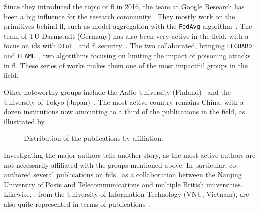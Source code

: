 Since they introduced the topic of \gls{fl} in 2016, the team at Google Research has been a big influence for the research community \cite{konecny_FederatedLearningStrategies_2016,konecny_FederatedOptimizationDistributed_2016,mcmahan_Communicationefficientlearningdeep_2017,bonawitz_PracticalSecureAggregation_2017,bonawitz_FederatedLearningScale_2019}.
They mostly work on the primitives behind \gls{fl}, such as model aggregation with the \texttt{FedAvg} algorithm~\cite{mcmahan_Communicationefficientlearningdeep_2017}.
The team of TU Darmstadt (Germany) has also been very active in the field, with a focus on \gls{ids} with \texttt{DÏoT}~\cite{marchal_AuDIAutonomousIoT_2019,nguyen_DIoTFederatedSelflearning_2019} and \gls{fl} security~\cite{nguyen_PoisoningAttacksFederated_2020b}.
The two collaborated, bringing \texttt{FLGUARD}~\cite{nguyen_FLGUARDSecurePrivate_2021} and \texttt{FLAME}~\cite{nguyen_FLAMETamingBackdoors_2022}, two algorithms focusing on limiting the impact of poisoning attacks in \gls{fl}.
These series of works makes them one of the most impactful groups in the field.

Other noteworthy groups include the Aalto University (Finland)~\cite{nguyen_FLGUARDSecurePrivate_2021} and the University of Tokyo (Japan)~\cite{sun_AdaptiveFederatedLearning_2020,sun_AdaptiveIntrusionDetection_2021,qin_FederatedLearningBasedNetwork_2021}.
The most active country remains China, with a dozen institutions now amounting to a third of the publications in the field, as illustrated by .


\begin{figure}
  \centering
  
  \caption{
    Distribution of the publications by affiliation.
    \label{fig:sota.affiliations}
  }
\end{figure}

Investigating the major authors tells another story, as the most active authors are not necessarily affiliated with the groups mentioned above.
In particular,  co-authored several publications on \gls{fids}~\cite{popoola_FederatedDeepLearning_2021,popoola_FederatedDeepLearning_2021a,popoola_OptimizingDeepLearning_2022,popoola_FederatedDeepLearning_2023} as a collaboration between the Nanjing University of Posts and Telecommunications and multiple British universities.
Likewise, , from the University of Information Technology (VNU, Vietnam), are also quite represented in terms of publications~\cite{duy_Federatedlearningbasedintrusion_2021,vy_FederatedLearningBasedIntrusion_2021,thi_FederatedLearningBasedCyber_2022,quyen_FederatedIntrusionDetection_2022}.
  
